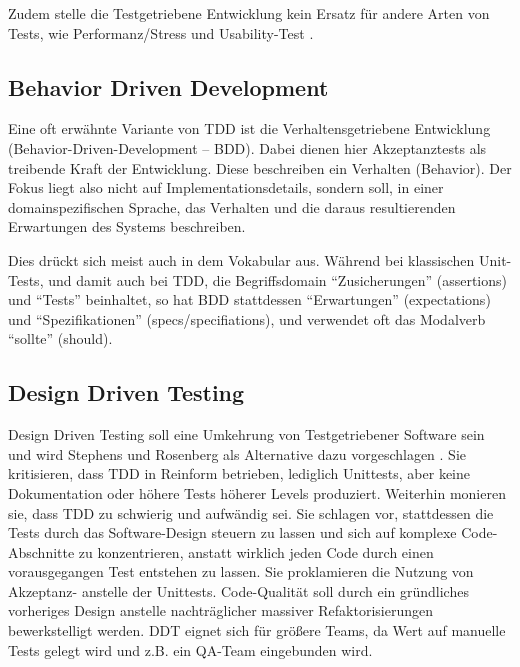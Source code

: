   Zudem stelle die Testgetriebene Entwicklung kein Ersatz für andere Arten von Tests, wie Performanz/Stress und Usability-Test \citep[S. 86]{beck_test_2002}.
  \subsection{Behavior Driven Development}
  
  Eine oft erwähnte Variante von TDD ist die Verhaltensgetriebene Entwicklung (Behavior-Driven-Development -- BDD). Dabei dienen hier Akzeptanztests als treibende Kraft der Entwicklung. Diese beschreiben ein Verhalten (Behavior). Der Fokus liegt also nicht auf Implementationsdetails, sondern soll, in einer domainspezifischen Sprache, das Verhalten und die daraus resultierenden Erwartungen des Systems beschreiben.
  
  Dies drückt sich meist auch in dem Vokabular aus. Während bei klassischen Unit-Tests, und damit auch bei TDD, die Begriffsdomain  "`Zusicherungen"' (assertions) und "`Tests"' beinhaltet, so hat BDD stattdessen "`Erwartungen"' (expectations) und "`Spezifikationen"' (specs/specifiations), und verwendet oft das Modalverb "`sollte"' (should).
  
  \subsection{Design Driven Testing}
  Design Driven Testing soll eine Umkehrung von Testgetriebener Software sein und wird Stephens und Rosenberg als Alternative dazu vorgeschlagen \citep{stephens_design_2010}. Sie kritisieren, dass TDD in Reinform betrieben, lediglich Unittests, aber keine Dokumentation oder höhere Tests höherer Levels produziert. Weiterhin monieren sie, dass TDD zu schwierig und aufwändig sei. Sie schlagen vor, stattdessen die Tests durch das Software-Design steuern zu lassen und sich auf komplexe Code-Abschnitte zu konzentrieren, anstatt wirklich jeden Code durch einen vorausgegangen Test entstehen zu lassen. Sie proklamieren die Nutzung von Akzeptanz- anstelle der Unittests. Code-Qualität soll durch ein gründliches vorheriges Design anstelle nachträglicher massiver Refaktorisierungen bewerkstelligt werden.
  DDT eignet sich für größere Teams, da Wert auf manuelle Tests gelegt wird und z.B. ein QA-Team eingebunden wird.